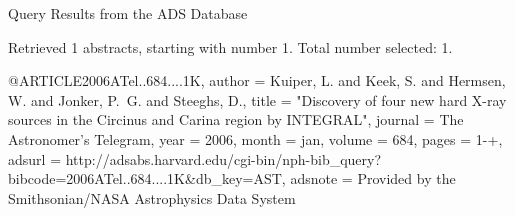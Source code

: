 Query Results from the ADS Database


Retrieved 1 abstracts, starting with number 1.  Total number selected: 1.

@ARTICLE{2006ATel..684....1K,
   author = {{Kuiper}, L. and {Keek}, S. and {Hermsen}, W. and {Jonker}, P.~G. and 
	{Steeghs}, D.},
    title = "{Discovery of four new hard X-ray sources in the Circinus and Carina region by INTEGRAL}",
  journal = {The Astronomer's Telegram},
     year = 2006,
    month = jan,
   volume = 684,
    pages = {1-+},
   adsurl = {http://adsabs.harvard.edu/cgi-bin/nph-bib_query?bibcode=2006ATel..684....1K&db_key=AST},
  adsnote = {Provided by the Smithsonian/NASA Astrophysics Data System}
}


